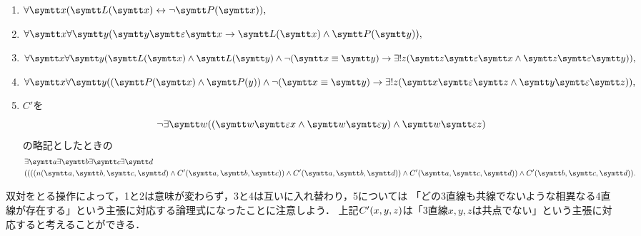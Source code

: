 \begin{enumerate}
	\NewDocumentCommand{\LiesOn}{}{\obj{\varepsilon}}
	\item \(\forall \obj{x} \paren{\apply{\obj{L}}{\obj{x}} \formulaequiv \lnot \apply{\obj{P}}{\obj{x}}},\)
	\item \(\forall \obj{x} \forall \obj{y} \paren{\obj{y} \LiesOn \obj{x} \to \apply{\obj{L}}{\obj{x}} \land \apply{\obj{P}}{\obj{y}}},\)
	\item \(\forall \obj{x} \forall \obj{y} \paren{\apply{\obj{L}}{\obj{x}} \land \apply{\obj{L}}{\obj{y}} \land \lnot \paren{\obj{x} \objeq \obj{y}}
		      \to \uexists z \paren{\obj{z} \LiesOn \obj{x} \land \obj{z} \LiesOn \obj{y}}},\)
	\item \(\forall \obj{x} \forall \obj{y} \paren{\paren{\apply{\obj{P}}{\obj{x}} \land \apply{\obj{P}}{y}} \land \lnot \paren{\obj{x} \objeq \obj{y}}
		      \to \uexists z \paren{\obj{x} \LiesOn \obj{z} \land \obj{y} \LiesOn \obj{z}}},\)
	\item \(C'\)を
	      \[
		      \lnot \exists \obj{w} \paren{\paren{\obj{w} \LiesOn x \land \obj{w} \LiesOn y} \land \obj{w} \LiesOn z}
	      \]
	      の略記としたときの
	      \begin{align*}
		       & \exists \obj{a} \exists \obj{b} \exists \obj{c} \exists \obj{d} \\
		       & \paren{
			      \paren{\paren{\paren{\apply{n}{\obj{a}, \obj{b}, \obj{c}, \obj{d}}
						      \land \apply{C'}{\obj{a}, \obj{b}, \obj{c}}}
					      \land \apply{C'}{\obj{a}, \obj{b}, \obj{d}}}
				      \land \apply{C'}{\obj{a}, \obj{c}, \obj{d}}}
			      \land \apply{C'}{\obj{b}, \obj{c}, \obj{d}}
		      }.
	      \end{align*}
\end{enumerate}

双対をとる操作によって，1と2は意味が変わらず，3と4は互いに入れ替わり，5については
「どの3直線も共線でないような相異なる4直線が存在する」という主張に対応する論理式になったことに注意しよう．
上記\(\apply{C'}{x, y, z}\)は「3直線\(x, y, z\)は共点でない」という主張に対応すると考えることができる．

\section*{}

\subsection*{}

